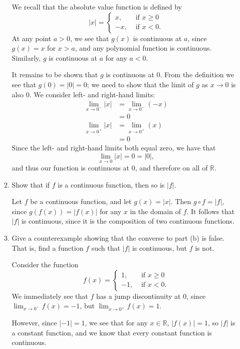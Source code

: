 \documentclass[letterpaper,12pt]{article}
\newcommand{\abs}[1]{\lvert #1\rvert}
\newcommand{\R}{\mathbb{R}}
\newcommand{\di}{\displaystyle}
\begin{document}
\begin{enumerate}
\begin{enumerate}
We recall that the absolute value function is defined by
\[
\abs{x} = \begin{cases} x, & \text{ if } x\geq 0\\-x, & \text{ if } x<0.\end{cases}
\]
At any point $a>0$, we see that $g(x)$ is continuous at $a$, since $g(x)=x$ for $x>a$, and any polynomial function is continuous. Similarly, $g$ is continuous at $a$ for any $a<0$.

It remains to be shown that $g$ is continuous at 0. From the definition we see that $g(0)=\abs{0}=0$; we need to show that the limit of $g$ as $x\to 0$ is also 0. We consider left- and right-hand limits:
\begin{align*}
\lim_{x\to 0^-}\abs{x} & = \lim_{x\to 0^-}(-x)\tag{Since $x<0$}\\
& = 0 \tag{By direct subsitution}\\
\lim_{x\to 0^+}\abs{x} & = \lim_{x\to 0^+}(x) \tag{Since $x>0$}\\
& = 0 \tag{By direct subsitution}
\end{align*} 
Since the left- and right-hand limits both equal zero, we have that
\[
\lim_{x\to 0}\abs{x} = 0 = \abs{0},
\]
and thus our function is continuous at 0, and therefore on all of $\R$.

\item Show that if $f$ is a continuous function, then so is $\abs{f}$.

Let $f$ be a continuous function, and let $g(x)=\abs{x}$. Then $g\circ f = \abs{f}$, since $g(f(x)) = \abs{f(x)}$ for any $x$ in the domain of $f$. It follows that $\abs{f}$ is continuous, since it is the composition of two continuous functions.

\item Give a counterexample showing that the converse to part (b) is false. That is, find a function $f$ such that $\abs{f}$ is continuous, but $f$ is not.

Consider the function
\[
f(x) = \begin{cases} 1, & \text{ if } x\geq 0\\-1, & \text{ if } x<0.\end{cases}
\]
We immediately see that $f$ has a jump discontinuity at 0, since $\di \lim_{x\to 0^-}f(x) = -1$, but $\di \lim_{x\to 0^+}f(x)=1$.

However, since $\abs{-1}=1$, we see that for any $x\in \R$, $\abs{f(x)} = 1$, so $\abs{f}$ is a constant function, and we know that every constant function is continuous.
\end{enumerate}


\end{enumerate}
\end{document}
